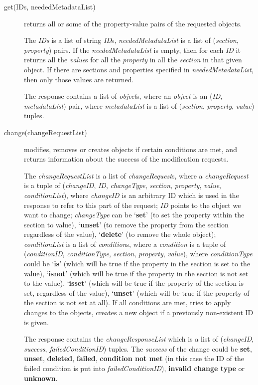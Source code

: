 \documentclass{book}
\begin{document}
\begin{description}
    \item [get(IDs, neededMetadataList)] returns all or some of the property-value pairs of the requested objects.
    
    The \emph{IDs} is a list of string \emph{ID}s, \emph{neededMetadataList} is a list of (\emph{section}, \emph{property}) pairs. If the \emph{neededMetadataList} is empty, then for each \emph{ID} it returns all the \emph{value}s for all the \emph{property} in all the \emph{section} in that given object. If there are sections and properties specified in \emph{neededMetadataList}, then only those values are returned.

    The response contains a list of \emph{object}s, where an \emph{object} is an (\emph{ID}, \emph{metadataList}) pair, where \emph{metadataList} is a list of (\emph{section}, \emph{property}, \emph{value}) tuples.

    \item [change(changeRequestList)] modifies, removes or creates objects if certain conditions are met, and returns information about the success of the modification requests.
    
    The \emph{changeRequestList} is a list of \emph{changeRequest}s, where a \emph{changeRequest} is a tuple of (\emph{changeID}, \emph{ID}, \emph{changeType}, \emph{section}, \emph{property}, \emph{value}, \emph{conditionList}), where \emph{changeID} is an arbitrary ID which is used in the response to refer to this part of the request; \emph{ID} points to the object we want to change; \emph{changeType} can be `\textbf{set}' (to set the property within the section to value), `\textbf{unset}' (to remove the property from the section regardless of the value), `\textbf{delete}' (to remove the whole object); \emph{conditionList} is a list of \emph{condition}s, where a \emph{condition} is a tuple of (\emph{conditionID}, \emph{conditionType}, \emph{section}, \emph{property}, \emph{value}), where \emph{conditionType} could be `\textbf{is}' (which will be true if the property in the section is set to the value), `\textbf{isnot}' (which will be true if the property in the section is not set to the value), `\textbf{isset}' (which will be true if the property of the section is set, regardless of the value), `\textbf{unset}' (which will be true if the property of the section is not set at all).
    If all conditions are met, tries to apply changes to the objects, creates a new object if a previously non-existent ID is given.
    
    The response contains the \emph{changeResponseList} which is a list of (\emph{changeID}, \emph{success}, \emph{failedConditionID}) tuples. The \emph{success} of the change could be \textbf{set}, \textbf{unset}, \textbf{deleted}, \textbf{failed}, \textbf{condition not met} (in this case the ID of the failed condition is put into \emph{failedConditionID}), \textbf{invalid change type} or \textbf{unknown}.
    
    
\end{description}
    
\end{document}
